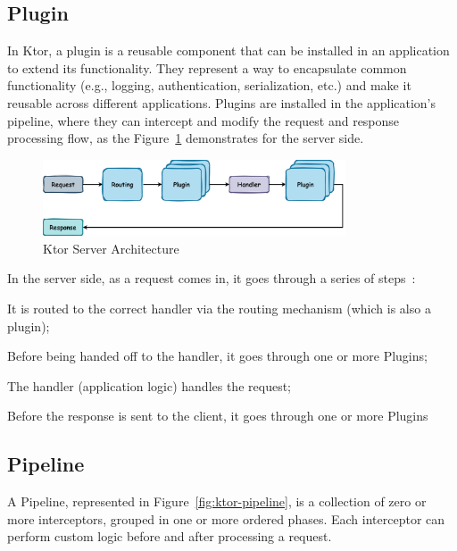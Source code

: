 \subsection{Plugin}\label{subsec:plugin}

In Ktor, a plugin is a reusable component that can be installed in an application to extend its functionality.
They represent a way to encapsulate common functionality (e.g., logging, authentication, serialization, etc.) and make it reusable across different applications.
Plugins are installed in the application's pipeline, where they can intercept and modify the request and response processing flow, as the Figure~\ref{fig:ktor-server-architecture} demonstrates for the server side.

\begin{figure}[!htb]
    \centering
    \includegraphics[width=0.8\textwidth]{../figures/03_ktor-server-architecture}
    \caption{Ktor Server Architecture}
    \label{fig:ktor-server-architecture}
\end{figure}

In the server side, as a request comes in, it goes through a series of steps~\cite{ktor-server-plugins}:

\begin{boldenumerate}[topsep=0pt,itemsep=0pt,partopsep=0pt, parsep=0pt]
    \item It is routed to the correct handler via the routing mechanism (which is also a plugin);
    \item Before being handed off to the handler, it goes through one or more Plugins;
    \item The handler (application logic) handles the request;
    \item Before the response is sent to the client, it goes through one or more Plugins
\end{boldenumerate}

\subsection{Pipeline}\label{subsec:pipeline}

A Pipeline, represented in Figure~\ref{fig:ktor-pipeline}, is a collection of zero or more interceptors, grouped in one or more ordered phases.
Each interceptor can perform custom logic before and after processing a request.

